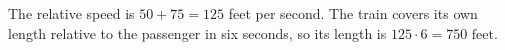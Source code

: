 The relative speed is $50+75=125$ feet per second. The train covers its own length relative to the passenger in six seconds, so its length is $125\cdot6=\boxed{750\text{ feet}}$.

